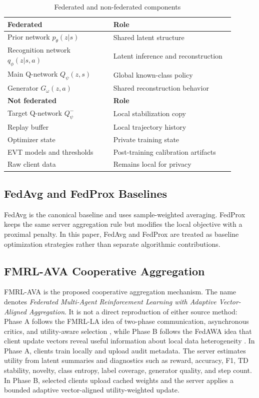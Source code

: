 \documentclass[10pt,twocolumn]{article}
\begin{document}
\begin{table}[t]
\centering
\caption{Federated and non-federated components}
\begin{tabular}{p{0.42\linewidth}p{0.48\linewidth}}
\toprule
\textbf{Federated} & \textbf{Role} \\
\midrule
Prior network $p_\theta(z|s)$ & Shared latent structure \\
Recognition network $q_\phi(z|s,a)$ & Latent inference and reconstruction \\
Main Q-network $Q_\psi(z,s)$ & Global known-class policy \\
Generator $G_\omega(z,a)$ & Shared reconstruction behavior \\
\midrule
\textbf{Not federated} & \textbf{Role} \\
\midrule
Target Q-network $Q_\psi^-$ & Local stabilization copy \\
Replay buffer & Local trajectory history \\
Optimizer state & Private training state \\
EVT models and thresholds & Post-training calibration artifacts \\
Raw client data & Remains local for privacy \\
\bottomrule
\end{tabular}
\end{table}

\subsection{FedAvg and FedProx Baselines}
FedAvg is the canonical baseline and uses sample-weighted averaging. FedProx keeps the same server aggregation rule but modifies the local objective with a proximal penalty. In this paper, FedAvg and FedProx are treated as baseline optimization strategies rather than separate algorithmic contributions.

\subsection{FMRL-AVA Cooperative Aggregation}
FMRL-AVA is the proposed cooperative aggregation mechanism. The name denotes \emph{Federated Multi-Agent Reinforcement Learning with Adaptive Vector-Aligned Aggregation}. It is not a direct reproduction of either source method: Phase A follows the FMRL-LA idea of two-phase communication, asynchronous critics, and utility-aware selection \citep{zhang2024fmrl}, while Phase B follows the FedAWA idea that client update vectors reveal useful information about local data heterogeneity \citep{shi2025fedawa}. In Phase A, clients train locally and upload audit metadata. The server estimates utility from latent summaries and diagnostics such as reward, accuracy, F1, TD stability, novelty, class entropy, label coverage, generator quality, and step count. In Phase B, selected clients upload cached weights and the server applies a bounded adaptive vector-aligned utility-weighted update.
\end{document}
